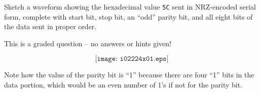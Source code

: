 

Sketch a waveform showing the hexadecimal value {\tt 5C} sent in NRZ-encoded serial form, complete with start bit, stop bit, an ``odd'' parity bit, and all eight bits of the data sent in proper order.

\vfil

\eject






This is a graded question -- no answers or hints given!







$$\texttt{[image: i02224x01.eps]}$$

Note how the value of the parity bit is ``1'' because there are four ``1'' bits in the data portion, which would be an even number of 1's if not for the parity bit.




